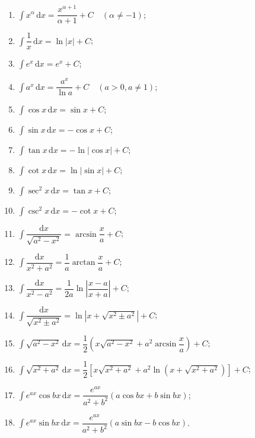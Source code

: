 \begin{theorem}
    \begin{enumerate}
        \item $\displaystyle\int x^\alpha\,\mathrm{d}x=\dfrac{x^{\alpha+1}}{\alpha+1}+C\quad(\alpha\neq-1)$;
        \item $\displaystyle\int\dfrac{1}{x}\,\mathrm{d}x=\ln|x|+C$;
        \item $\displaystyle\int e^x\,\mathrm{d}x=e^x+C$;
        \item $\displaystyle\int a^x\,\mathrm{d}x=\dfrac{a^x}{\ln a}+C\quad(a>0,a\neq1)$;
        \item $\displaystyle\int\cos x\,\mathrm{d}x=\sin x+C$;
        \item $\displaystyle\int\sin x\,\mathrm{d}x=-\cos x+C$;
        \item $\displaystyle\int\tan x\,\mathrm{d}x=-\ln|\cos x|+C$;
        \item $\displaystyle\int\cot x\,\mathrm{d}x=\ln|\sin x|+C$;
        \item $\displaystyle\int\sec^2x\,\mathrm{d}x=\tan x+C$;
        \item $\displaystyle\int\csc^2x\,\mathrm{d}x=-\cot x+C$;
        \item $\displaystyle\int\dfrac{\mathrm{d}x}{\sqrt{a^2-x^2}}=\arcsin\dfrac{x}{a}+C$;
        \item $\displaystyle\int\dfrac{\mathrm{d}x}{x^2+a^2}=\dfrac{1}{a}\arctan\dfrac{x}{a}+C$;
        \item $\displaystyle\int\dfrac{\mathrm{d}x}{x^2-a^2}=\dfrac{1}{2a}\ln\left|\dfrac{x-a}{x+a}\right|+C$;
        \item $\displaystyle\int\dfrac{\mathrm{d}x}{\sqrt{x^2\pm a^2}}=\ln\left|x+\sqrt{x^2\pm a^2}\right|+C$;
        \item $\displaystyle\int\sqrt{a^2-x^2}\,\mathrm{d}x
                  =\dfrac{1}{2}\left(x\sqrt{a^2-x^2}+a^2\arcsin\dfrac{x}{a}\right)+C$;
        \item $\displaystyle\int\sqrt{x^2+a^2}\,\mathrm{d}x
                  =\dfrac{1}{2}\left[x\sqrt{x^2+a^2}+a^2\ln\left(x+\sqrt{x^2+a^2}\right)\right]+C$;
        \item $\displaystyle\int e^{ax}\cos bx\,\mathrm{d}x
                  =\dfrac{e^{ax}}{a^2+b^2}(a\cos bx+b\sin bx)$;
        \item $\displaystyle\int e^{ax}\sin bx\,\mathrm{d}x
                  =\dfrac{e^{ax}}{a^2+b^2}(a\sin bx-b\cos bx)$.
    \end{enumerate}
\end{theorem}

